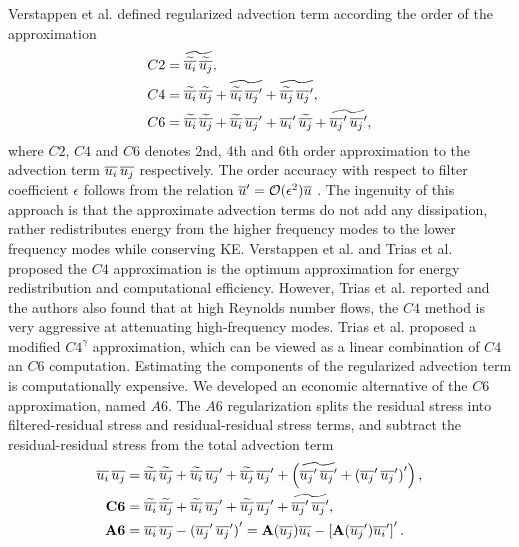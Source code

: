 Verstappen et al. defined regularized advection term according the order of the approximation
\begin{equation}
\begin{split}
C2 & = \widetilde{ \widetilde{\overline{u_i}} \, \widetilde{\overline{u_j}} },
\\
C4 & = \widetilde{\overline{u_i}} \, \widetilde{\overline{u_j}} 
 + \widetilde{ \widetilde{\overline{u_i}} \, {\overline{u_j}}^{\prime} }
 + \widetilde{ \widetilde{\overline{u_j}} \, {\overline{u_j}}^{\prime} },
\\
C6 & = \widetilde{\overline{u_i}} \, \widetilde{\overline{u_j}} 
 + \widetilde{\overline{u_i}} \, {\overline{u_j}}^{\prime}
 + {\overline{u_i}}^{\prime} \, \widetilde{\overline{u_j}}
 + \widetilde{ {\overline{u_j}}^{\prime} \, {\overline{u_j}}^{\prime} },
\\
\end{split}
\end{equation}
where $C2$, $C4$ and $C6$ denotes 2nd, 4th and 6th order approximation to the advection term $\overline{u_i} \, \overline{u_j} $ respectively. The order accuracy with respect to filter coefficient $\epsilon$ follows from the relation ${\overline{u}}^{\prime} = \mathcal{O}(\epsilon^2) \overline{u} $ \cite{carati1999}. The ingenuity of this approach is that the approximate advection terms do not add any dissipation, rather redistributes energy from the higher frequency modes to the lower frequency modes while conserving KE. Verstappen et al. \cite{verstappen2008} and Trias et al. \cite{trias2014} proposed the $C4$ approximation is the optimum approximation for energy redistribution and computational efficiency. However, Trias et al. \cite{trias2019} reported and the authors also found that at high Reynolds number flows, the $C4$ method is very aggressive at attenuating high-frequency modes. Trias et al. \cite{trias2019} proposed a modified $C4^\gamma$ approximation, which can be viewed as a linear combination of $C4$ an $C6$ computation. Estimating the components of the regularized advection term is computationally expensive. We developed an economic alternative of the $C6$ approximation, named $A6$. The $A6$ regularization splits the residual stress into filtered-residual stress and residual-residual stress terms, and subtract the residual-residual stress from the total advection term 
\begin{equation}
\begin{split}
\overline{u_i} \, \overline{u_j} & = 
 \widetilde{\overline{u_i}} \, \widetilde{\overline{u_j}} 
 + \widetilde{\overline{u_i}} \, {\overline{u_j}}^{\prime}
 + \widetilde{\overline{u_j}} \, {\overline{u_j}}^{\prime}
 + \left(
 \widetilde{ {\overline{u_j}}^{\prime} \, {\overline{u_j}}^{\prime} }
 + \left( {\overline{u_j}}^{\prime} \, {\overline{u_j}}^{\prime} \right) ^{\prime}
 \right),
\\ 
\mathbf{C6} & = \widetilde{\overline{u_i}} \, \widetilde{\overline{u_j}} 
 + \widetilde{\overline{u_i}} \, {\overline{u_j}}^{\prime}
 + \widetilde{\overline{u_j}} \, {\overline{u_j}}^{\prime}
 + \widetilde{ {\overline{u_j}}^{\prime} \, {\overline{u_j}}^{\prime} },
\\
\mathbf{A6} & = \overline{u_i} \, \overline{u_j} - \left( {\overline{u_j}}^{\prime} \, {\overline{u_j}}^{\prime} \right) ^{\prime}
= \mathbf{A} (\overline{u_j}) \overline{u_i} 
 - \left[ \mathbf{A} ( {\overline{u_j}}^{\prime}) {\overline{u_i}}^{\prime} \right]^{\prime}. 
\end{split}
\label{eqn:A6}
\end{equation}

